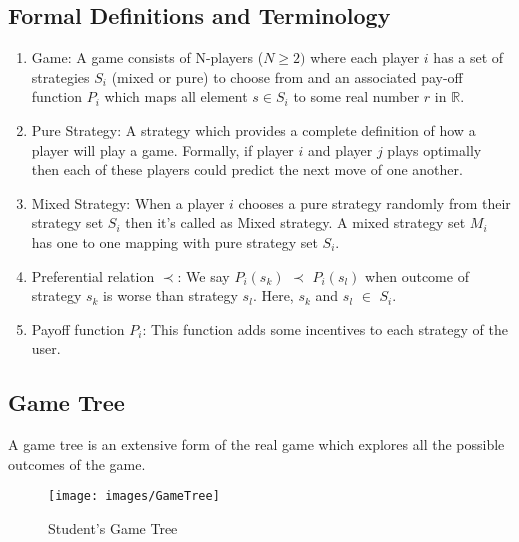 \subsection{Formal Definitions and Terminology}
\begin{enumerate}
    \item Game: A game consists of N-players ($N\geq2)$ where each player $i$ has a set of strategies $S_i$ (mixed or pure) to choose from and an associated pay-off function $P_i$ which maps all element $s \in S_i$ to some real number $r$ in $\mathbb{R}$. 
    \item Pure Strategy: A strategy which provides a complete definition of how a player will play a game. Formally, if player $i$ and player $j$ plays optimally then each of these players could predict the next move of one another.
    \item Mixed Strategy: When a player $i$ chooses a pure strategy randomly from their strategy set $S_i$ then it's called as Mixed strategy. A mixed strategy set $M_i$ has one to one mapping with pure strategy set $S_i$.
    \item Preferential relation $\prec$: We say $P_i(s_k)$ $\prec$ $P_i(s_l)$ when outcome of strategy $s_k$ is worse than strategy $s_l$. Here, $s_k$ and $s_l$ $\in$ $S_i$.
    \item Payoff function $P_i$: This function adds some incentives to each strategy of the user.
\end{enumerate}

\subsection{Game Tree}
A game tree is an extensive form of the real game which explores all the possible outcomes of the game. 
\begin{figure}[h!]
\centering
\texttt{[image: images/GameTree]}
\caption{Student's Game Tree}
\label{figure1}
\end{figure}

